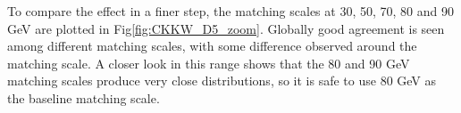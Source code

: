 To compare the effect in a finer step, the matching scales at 30, 50, 70, 80 and 90 GeV are plotted in Fig\ref{fig:CKKW_D5_zoom}. Globally good agreement is seen among different matching scales, with some difference observed around the matching scale. A closer look in this range shows that the 80 and 90 GeV matching scales produce very close distributions, so it is safe to use 80 GeV as the baseline matching scale.

\begin{figure}[h!]
	\centering  
	\hfill
\end{figure}
